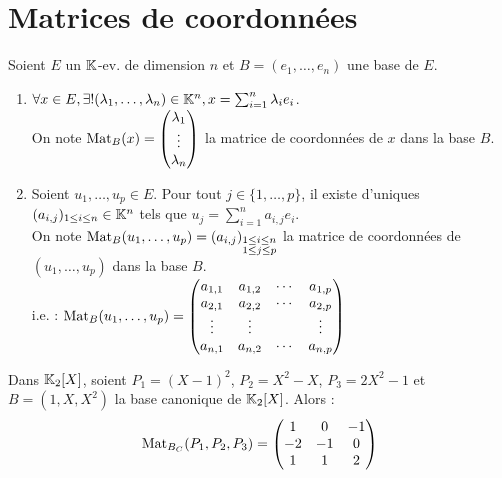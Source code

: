 \documentclass[12pt, a4paper]{report}
\begin{document}
\section{Matrices de coordonnées}

\begin{definition}
    Soient $E$ un $\mathbb{K}$-ev. de dimension $n$ et $B = (e_1,\dots,e_n)$ une base de $E$.

    \begin{enumerate}
        \item $\forall x \in E, \exists ! (\lambda_1,\dots,\lambda_n) \in \mathbb{K}^n, x = \sum_{i=1}^n \lambda_i e_i$. 
        \\On note $\mathrm{Mat}_{B}(x) = \left(\begin{matrix}
            \lambda_1 \\ \vdots \\ \lambda_n
        \end{matrix}\right)$ la matrice de coordonnées de $x$ dans la base $B$.
        \item Soient $u_1,\dots,u_p \in E$. Pour tout $j \in \{1,\dots,p\}$, il existe d'uniques $(a_{i,j})_{1 \leq i \leq n} \in \mathbb{K}^n$ tels que $u_j = \sum_{i=1}^n a_{i,j} e_i$.\\On note $\mathrm{Mat}_B(u_1,\dots,u_p) = (a_{i,j})_{\substack{1 \leq i \leq n\\ 1\leq j \leq p}}$ la matrice de coordonnées de $(u_1,\dots,u_p)$ dans la base $B$.\\i.e. : $\mathrm{Mat}_B(u_1,\dots,u_p) = \left(\begin{matrix}
a_{1,1} & a_{1,2} & \cdots & a_{1,p}
\\ a_{2,1} & a_{2,2} & \cdots & a_{2,p}
\\ \vdots & \vdots & & \vdots
\\ a_{n,1} & a_{n,2} & \cdots & a_{n,p}
\end{matrix}\right)$
    \end{enumerate}
    
\end{definition}

\begin{example}
    Dans $\mathbb{K}_2[X]$, soient $P_1 = (X-1)^2$, $P_2 = X^2 - X$, $P_3 = 2X^2 - 1$ et $B = (1,X,X^2)$ la base canonique de $\mathbb{K}_2[X]$. Alors :
    $$\mathrm{Mat}_{B_{C}}(P_1,P_2,P_3) = \left(\begin{matrix}
        1 & 0 & -1 \\
        -2 & -1 & 0 \\
        1 & 1 & 2
    \end{matrix}\right)$$
\end{example}
\end{document}
